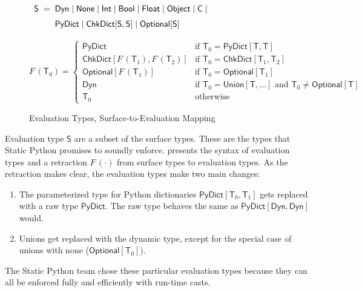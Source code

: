\documentclass[english,cleveref,submission]{programming}
\makeatletter
\newcommand{\SP}{Static Python}
\newcommand{\defeq}{=}
\newcommand{\mfeq}{=}
\newcommand{\langmid}{\mid} %
\newenvironment{langarray}{\(\def\arraystretch{1.5}\begin{array}{l@{\hspace{2mm}}c@{\hspace{2mm}}l}}{\end{array}\)}
\newcommand{\typefont}[1]{\mathsf{#1}}
\newcommand{\paramtype}[2]{#1[#2]}
\newcommand{\sptype}{\typefont{T}}
\newcommand{\spteval}{\typefont{S}}
\newcommand{\sptclass}{\typefont{C}}
\newcommand{\sptint}{\typefont{Int}}
\newcommand{\sptbool}{\typefont{Bool}}
\newcommand{\sptfloat}{\typefont{Float}}
\newcommand{\sptdyn}{\typefont{Dyn}}
\newcommand{\sptobject}{\typefont{Object}}
\newcommand{\sptnone}{\typefont{None}}
\newcommand{\sptoptional}[1]{\paramtype{\typefont{Optional}}{#1}}
\newcommand{\sptunion}[1]{\paramtype{\typefont{Union}}{#1}}
\newcommand{\sptrawpydict}{\typefont{PyDict}}
\newcommand{\sptpydict}[2]{\paramtype{\sptrawpydict}{#1, #2}}
\newcommand{\sptchkdict}[2]{\paramtype{\typefont{ChkDict}}{#1, #2}}
\newcommand{\mfapply}[2]{#1\,(#2)}
\newcommand{\mffont}[1]{\mathit{#1}}
\newcommand{\mftypeF}[1]{\mfapply{\mffont{F}}{#1}}
\makeatother
\begin{document}
\begin{figure}[t]
  \begin{langarray}
    \spteval & \defeq &
      \sptdyn \langmid
      \sptnone \langmid
      \sptint \langmid
      \sptbool \langmid
      \sptfloat \langmid
      \sptobject \langmid
      \sptclass \langmid
    \\ & &
      \sptrawpydict \langmid
      \sptchkdict{\spteval}{\spteval} \langmid
      \sptoptional{\spteval}
  \end{langarray}

  \bigskip
  \(
    \mftypeF{\sptype_0}
    \mfeq
    \left\{\begin{array}{ll}
      \sptrawpydict & \mbox{if $\sptype_0 = \sptpydict{\sptype}{\sptype}$}
    \\
      \sptchkdict{\mftypeF{\sptype_1}}{\mftypeF{\sptype_2}} & \mbox{if $\sptype_0 = \sptchkdict{\sptype_1}{\sptype_2}$}
    \\
      \sptoptional{\mftypeF{\sptype_1}} & \mbox{if $\sptype_0 = \sptoptional{\sptype_1}$}
    \\
      \sptdyn & \mbox{if $\sptype_0 = \sptunion{\sptype, \ldots}$ and $\sptype_0 \neq \sptoptional{\sptype}$}
    \\
      \sptype_0 & \mbox{otherwise}
    \end{array}\right.
  \)

  \caption{Evaluation Types, Surface-to-Evaluation Mapping}
  \label{f:surface-to-eval-types}
\end{figure}

Evaluation type $\spteval$ are a subset of the surface types.
These are the types that \SP{} promises to soundly enforce.
 presents the syntax of evaluation types
and a retraction $\mftypeF{\cdot}$ from surface types to evaluation types.
As the retraction makes clear, the evaluation types make two main changes:
\begin{enumerate}
  \item
    The parameterized type for Python dictionaries
    $\sptpydict{\sptype_0}{\sptype_1}$ gets replaced with
    a raw type $\sptrawpydict$.
    The raw type behaves the same as $\sptpydict{\sptdyn}{\sptdyn}$ would.
  \item
    Unions get replaced with the dynamic type, except for the special case
    of unions with none ($\sptoptional{\sptype_0}$).
\end{enumerate}

The \SP{} team chose these particular evaluation types because they can all
be enforced fully and efficiently with run-time casts.
\end{document}
